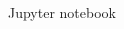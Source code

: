 \documentclass[t, utf8, 10pt]{beamer}
\begin{document}
\begin{frame}{Jupyter notebook}
 \begin{columns}
  \begin{column}{0.6\textwidth}

\end{column}
\end{columns}
\end{frame}
\end{document}
